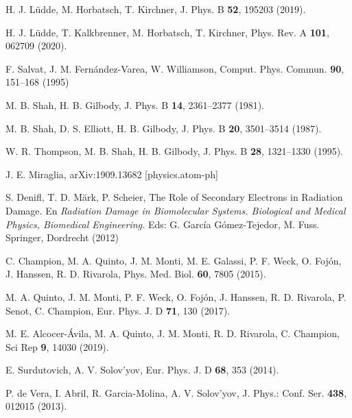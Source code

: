 \begin{thebibliography}{9}
H. J. L\"udde, M. Horbatsch, T. Kirchner,
J. Phys. B \textbf{52}, 195203 (2019).

H. J. L\"udde, T. Kalkbrenner, M. Horbatsch, T. Kirchner,
Phys. Rev. A \textbf{101}, 062709 (2020).

F. Salvat, J. M. Fern\'andez-Varea, W. Williamson,
Comput. Phys. Commun. \textbf{90}, 151--168 (1995)

M. B. Shah, H. B. Gilbody,
J. Phys. B \textbf{14}, 2361--2377 (1981).

M. B. Shah, D. S. Elliott, H. B. Gilbody,
J. Phys. B \textbf{20}, 3501--3514 (1987).

W. R. Thompson, M. B. Shah, H. B. Gilbody,
J. Phys. B \textbf{28}, 1321--1330 (1995).

J. E. Miraglia,
arXiv:1909.13682 [physics.atom-ph]

S. Denifl, T. D. M\"ark, P. Scheier,
The Role of Secondary Electrons in Radiation Damage. En 
\textit{Radiation Damage in Biomolecular Systems. Biological and Medical 
Physics, Biomedical Engineering.} Eds: G. García Gómez-Tejedor, M. Fuss. 
Springer, Dordrecht (2012) 

C. Champion, M. A. Quinto, J. M. Monti, M. E. Galassi, P. F. Weck, 
O. Fojón, J. Hanssen, R. D. Rivarola, 
Phys. Med. Biol. \textbf{60}, 7805 (2015).

M. A. Quinto, J. M. Monti, P. F. Weck, O. Fojón, J. Hanssen, 
R. D. Rivarola, P. Senot, C. Champion,
Eur. Phys. J. D \textbf{71}, 130 (2017). 

M. E. Alcocer-Ávila, M. A. Quinto, J. M. Monti, R. D. Rivarola, 
C. Champion,
Sci Rep \textbf{9}, 14030 (2019). 

E. Surdutovich, A. V. Solov'yov, 
Eur. Phys. J. D \textbf{68}, 353 (2014).

P. de Vera, I. Abril, R. Garcia-Molina, A. V. Solov'yov,
J. Phys.: Conf. Ser. \textbf{438}, 012015 (2013).


\end{thebibliography}
